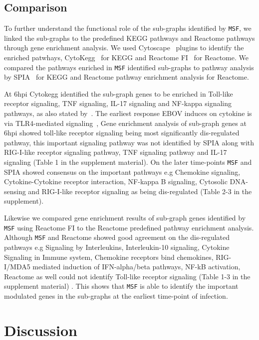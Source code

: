 \documentclass[twocolumn]{article}
\begin{document}
 

\subsection*{Comparison} 

To further understand the functional role of the sub-graphs identified by \texttt{MSF}, we linked the  sub-graphs to the predefined KEGG pathways and Reactome
pathways through gene enrichment analysis. We used Cytoscape~\cite{Cyto} plugins to identify the enriched patwhays, CytoKegg~\cite{Cytokegg} for KEGG and Reactome FI~\cite{Reactome} for Reactome. We compared the pathways enriched in \texttt{MSF} identified sub-graphs to pathway analysis by SPIA~\cite{Tarca} for KEGG and Reactome pathway enrichment analysis for Reactome. 

At 6hpi Cytokegg identified the sub-graph genes to be enriched in Toll-like receptor signaling, TNF signaling, IL-17 signaling and NF-kappa signaling pathways, as also stated by~\cite{Olejnik}. The earliest response EBOV induces on cytokine is via TLR4-mediated signaling~\cite{Olejnik}, Gene enrichment analysis of sub-graph genes at 6hpi showed toll-like receptor signaling being most significantly dis-regulated pathway, this important signaling pathway was not identified by SPIA along with RIG-I-like receptor signaling pathway, TNF signaling pathway and IL-17 signaling (Table 1 in the supplement material). On the later time-points \texttt{MSF} and SPIA showed consensus on the important pathways e.g Chemokine signaling, Cytokine-Cytokine receptor interaction, NF-kappa B signaling, Cytosolic DNA-sensing and RIG-I-like receptor signaling as being dis-regulated (Table 2-3 in the supplement). 

Likewise we compared gene enrichment results of sub-graph genes identified by \texttt{MSF} using Reactome FI to the Reactome predefined pathway enrichment analysis. Although \texttt{MSF} and Reactome showed good agreement on the dis-regulated pathways e.g Signaling by Interleukins, Interleukin-10 signaling, Cytokine Signaling in Immune system, Chemokine receptors bind chemokines, RIG-I/MDA5 mediated induction of IFN-alpha/beta pathways, NF-kB activation, Reactome as well could not identify Toll-like receptor signaling (Table 1-3 in the supplement material) . This shows that \texttt{MSF} is able to identify the important modulated genes in the sub-graphs at the earliest time-point of infection.


\section*{Discussion}
\end{document}
